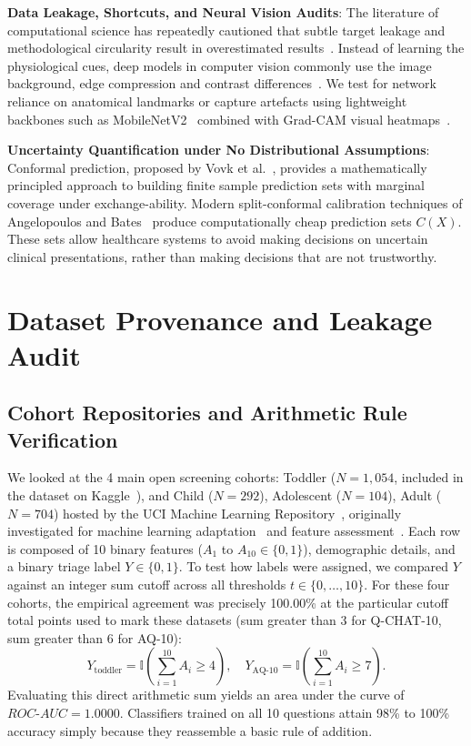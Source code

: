 \documentclass[conference]{IEEEtran}
\begin{document}
\noindent\textbf{Data Leakage, Shortcuts, and Neural Vision Audits}:
The literature of computational science has repeatedly cautioned that subtle target leakage and methodological circularity result in overestimated results~\cite{kapoor2023leakage}. Instead of learning the physiological cues, deep models in computer vision commonly use the image background, edge compression and contrast differences~\cite{geirhos2020shortcut}. We test for network reliance on anatomical landmarks or capture artefacts using lightweight backbones such as MobileNetV2~\cite{sandler2018mobilenetv2} combined with Grad-CAM visual heatmaps~\cite{selvaraju2017grad}.

\noindent\textbf{Uncertainty Quantification under No Distributional Assumptions}:
Conformal prediction, proposed by Vovk et al.~\cite{vovk2005algorithmic}, provides a mathematically principled approach to building finite sample prediction sets with marginal coverage under exchange-ability. Modern split-conformal calibration techniques of Angelopoulos and Bates~\cite{angelopoulos2021gentle} produce computationally cheap prediction sets $C(X)$. These sets allow healthcare systems to avoid making decisions on uncertain clinical presentations, rather than making decisions that are not trustworthy.

\section{Dataset Provenance and Leakage Audit}

\subsection{Cohort Repositories and Arithmetic Rule Verification}

We looked at the 4 main open screening cohorts: Toddler ($N = 1{,}054$, included in the dataset on Kaggle~\cite{kaggle_toddler}), and Child ($N = 292$), Adolescent ($N = 104$), Adult ($N = 704$) hosted by the UCI Machine Learning Repository~\cite{uci_asd_child, uci_asd_adolescent, uci_asd_adult}, originally investigated for machine learning adaptation~\cite{thabtah2017autism} and feature assessment~\cite{thabtah2018qchat}. Each row is composed of 10 binary features ($A_1$ to $A_{10} \in \{0, 1\}$), demographic details, and a binary triage label $Y \in \{0, 1\}$. To test how labels were assigned, we compared $Y$ against an integer sum cutoff across all thresholds $t \in \{0, \dots, 10\}$. For these four cohorts, the empirical agreement was precisely 100.00\% at the particular cutoff total points used to mark these datasets (sum greater than 3 for Q-CHAT-10, sum greater than 6 for AQ-10):
\begin{equation}
    Y_{\text{toddler}} = \mathbb{I}\left(\sum_{i=1}^{10} A_i \ge 4\right), \quad Y_{\text{AQ-10}} = \mathbb{I}\left(\sum_{i=1}^{10} A_i \ge 7\right).
\end{equation}
Evaluating this direct arithmetic sum yields an area under the curve of $ROC\text{-}AUC = 1.0000$. Classifiers trained on all 10 questions attain 98\% to 100\% accuracy simply because they reassemble a basic rule of addition.
\end{document}
